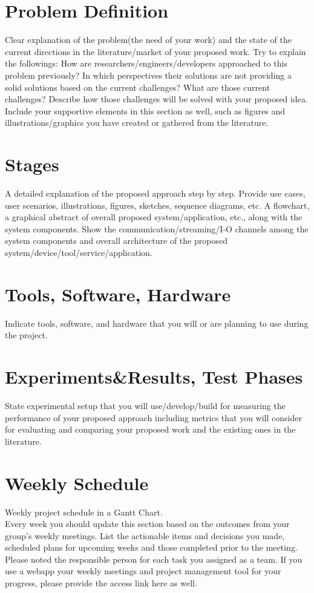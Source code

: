 \documentclass[14pt]{article}
\begin{document}
\section{Problem Definition}
Clear explanation of the problem(the need of your work) and the state of the current directions in the literature/market of your proposed work. Try to explain the followings: How are researchers/engineers/developers approached to this problem previously? In which perspectives their solutions are not providing a solid solutions based on the current challenges? What are those current challenges? Describe how those challenges will be solved with your proposed idea. Include your supportive elements in this section as well, such as figures and illustrations/graphics you have created or gathered from the literature.

\section{Stages}
A detailed explanation of the proposed approach step by step. Provide use cases, user scenarios, illustrations, figures, sketches, sequence diagrams, etc. A flowchart, a graphical abstract of overall proposed system/application, etc., along with the system components. Show the communication/streaming/I-O channels among the system components and overall architecture of the proposed system/device/tool/service/application. 

\section{Tools, Software, Hardware}
Indicate tools, software, and hardware that you will or are planning to use during the project.

\section{Experiments\&Results, Test Phases}
State experimental setup that you will use/develop/build for measuring the performance of your proposed approach including metrics that you will consider for evaluating and comparing your proposed work and the existing ones in the literature.

\section{Weekly Schedule}
Weekly project schedule in a Gantt Chart.\\
Every week you should update this section based on the outcomes from your group's weekly meetings. List the actionable items and decisions you made, scheduled plans for upcoming weeks and those completed prior to the meeting. Please noted the responsible person for each task you assigned as a team. If you use a webapp your weekly meetings and project management tool for your progress, please provide the access link here as well.
\end{document}
